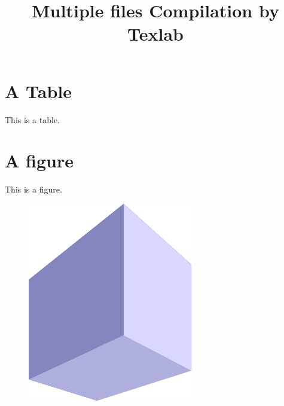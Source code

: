 \documentclass[a4paper,12pt]{article}
\title{Multiple files Compilation by Texlab}
\begin{document}
\maketitle
    \section{A Table}
    This is a table.
    
    \section{A figure}
    This is a figure.
    \begin{figure}
        \centering
        \includegraphics{figure/figure.pdf}
    \end{figure}
\end{document}
